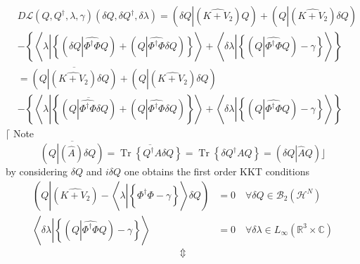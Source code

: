 \documentclass[aps,preprint]{revtex4}%
\begin{document}
\begin{align}
&  D\mathcal{L}\left(  Q,Q^{\dagger},\lambda,\gamma\right)  \left(  \delta
Q,\delta Q^{\dagger},\delta\lambda\right)  =\left(  \delta Q\left\vert \left(
\widehat{K+V_{2}}\right)  Q\right.  \right)  +\left(  Q\left\vert \left(
\widehat{K+V_{2}}\right)  \delta Q\right.  \right) \nonumber\\
&  -\left\{  \left\langle \lambda\left\vert \left\{  \left(  \delta
Q\left\vert \widehat{\Phi^{\dagger}\Phi}Q\right.  \right)  +\left(
Q\left\vert \widehat{\Phi^{\dagger}\Phi}\delta Q\right.  \right)  \right\}
\right.  \right\rangle +\left\langle \delta\lambda\left\vert \left\{  \left(
Q\left\vert \widehat{\Phi^{\dagger}\Phi}Q\right.  \right)  -\gamma\right\}
\right.  \right\rangle \right\} \nonumber\\
&  =\overline{\left(  Q\left\vert \left(  \widehat{K+V_{2}}\right)  \delta
Q\right.  \right)  }+\left(  Q\left\vert \left(  \widehat{K+V_{2}}\right)
\delta Q\right.  \right) \nonumber\\
&  -\left\{  \left\langle \lambda\left\vert \left\{  \overline{\left(
Q\left\vert \widehat{\Phi^{\dagger}\Phi}\delta Q\right.  \right)  }+\left(
Q\left\vert \widehat{\Phi^{\dagger}\Phi}\delta Q\right.  \right)  \right\}
\right.  \right\rangle +\left\langle \delta\lambda\left\vert \left\{  \left(
Q\left\vert \widehat{\Phi^{\dagger}\Phi}Q\right.  \right)  -\gamma\right\}
\right.  \right\rangle \right\}
\end{align}
$\lceil$ Note
\begin{equation}
\overline{\left(  Q\left\vert \left(  \widehat{A}\right)  \delta Q\right.
\right)  }=\overline{\operatorname{Tr}\left\{  Q^{\dagger}A\delta Q\right\}
}=\operatorname{Tr}\left\{  \delta Q^{\dagger}AQ\right\}  =\left(  \delta
Q\left\vert \widehat{A}Q\right.  \right)  \rfloor
\end{equation}
by considering $\delta Q$ and $i\delta Q$ one obtains the first order KKT
conditions
\begin{subequations}
\begin{align}
\left(  Q\left\vert \left(  \widehat{K+V_{2}}\right)  -\left\langle
\lambda\left\vert \left\{  \widehat{\Phi^{\dagger}\Phi}-\gamma\right\}
\right.  \right\rangle \right.  \delta Q\right)   &  =0\quad\forall\delta
Q\in\mathcal{B}_{2}\left(  \mathcal{H}^{N}\right) \\
\left\langle \delta\lambda\left\vert \left\{  \left(  Q\left\vert
\widehat{\Phi^{\dagger}\Phi}Q\right.  \right)  -\gamma\right\}  \right.
\right\rangle  &  =0\quad\forall\delta\lambda\in L_{\infty}\left(
\mathbb{R}^{3}\times\mathbb{C}\right)
\end{align}%
\end{subequations}
\[
\Updownarrow
\]
%
\end{document}
